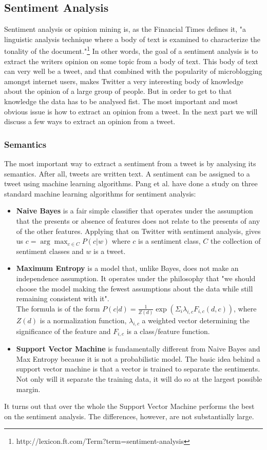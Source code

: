 \documentclass{article}
\begin{document}
\subsection{Sentiment Analysis}
Sentiment analysis or opinion mining is, as the Financial Times defines it, "a linguistic analysis technique where a body of text is examined to characterize the tonality of the document."\footnote{http://lexicon.ft.com/Term?term=sentiment-analysis} In other words, the goal of a sentiment analysis is to extract the writers opinion on some topic from a body of text. This body of text can very well be a tweet, and that combined with the popularity of microblogging amongst internet users, makes Twitter a very interesting body of knowledge about the opinion of a large group of people. But in order to get to that knowledge the data has to be analysed fist. 
The most important and most obvious issue is how to extract an opinion from a tweet. In the next part we will discuss a few ways to extract an opinion from a tweet.
\subsubsection*{Semantics }
The most important way to extract a sentiment from a tweet is by analysing its semantics. After all, tweets are written text. A sentiment can be assigned to a tweet using machine learning algorithms. Pang et al. \cite{machineLearning} have done a study on three standard machine learning algorithms for sentiment analysis: 
\begin{itemize}
\item \textbf{Naive Bayes} is a fair simple classifier that operates under the assumption that the presents or absence of features does not relate to the presents of any of the other features. Applying that on Twitter with sentiment analysis, gives us $c = \arg\max_{c\in C} P(c|w)$ where $c$ is a sentiment class, $C$ the collection of sentiment classes and $w$ is a tweet. \cite{sentAnalysis}
\item \textbf{Maximum Entropy} is a model that, unlike Bayes, does not make an independence assumption. It operates under the philosophy that "we should choose the model making the fewest assumptions about the data while still remaining consistent with it".\cite{machineLearning} \\
The formula is of the form $P(c|d) = \frac{1}{Z(d)}\exp(\Sigma_i \lambda_{i,c}F_{i,c}(d,c))$, where $Z(d)$ is a normalization function, $\lambda_{i,c}$ a weighted vector determining the significance of the feature and $F_{i,c}$ is a class/feature function. 
\item \textbf{Support Vector Machine} is fundamentally different from Naive Bayes and Max Entropy because it is not a probabilistic model. The basic idea behind a support vector machine is that a vector is trained to separate the sentiments. Not only will it separate the training data, it will do so at the largest possible margin. 
\end{itemize}
It turns out that over the whole the Support Vector Machine performs the best on the sentiment analysis\cite{machineLearning}. The differences, however, are not substantially large. 
\end{document}
